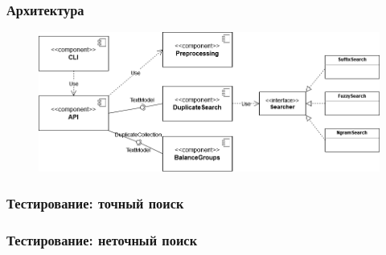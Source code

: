 \documentclass[aspectratio=169]{beamer}
\begin{document}

\begin{frame}\frametitle{Архитектура}
	\begin{figure}
		\includegraphics[scale=0.45]{../diploma/pictures/Architecture.png}
	\end{figure}
\end{frame}


\begin{frame}\frametitle{Тестирование: точный поиск}
	\begin{figure}[h!]
		\centering
		
	\end{figure}
\end{frame}

\begin{frame}\frametitle{Тестирование: неточный поиск}
	
	\begin{figure}[h!]
		\centering
		
	\end{figure}
	
\end{frame}

\end{document}
